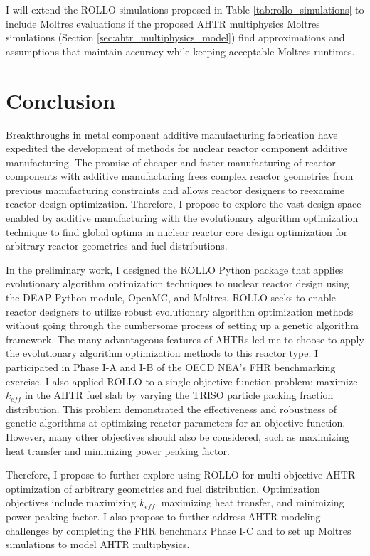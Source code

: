 I will extend the ROLLO simulations proposed in Table \ref{tab:rollo_simulations} 
to include Moltres evaluations if the proposed \gls{AHTR} multiphysics
Moltres simulations (Section \ref{sec:ahtr_multiphysics_model}) find approximations 
and assumptions that maintain accuracy while keeping acceptable Moltres runtimes.

\pagebreak
\section{Conclusion}
Breakthroughs in metal component additive manufacturing fabrication have 
expedited the development of methods for nuclear reactor component additive 
manufacturing.
The promise of cheaper and faster manufacturing of reactor components with 
additive manufacturing frees complex reactor geometries from previous manufacturing 
constraints and allows reactor designers to reexamine reactor design optimization. 
Therefore, I propose to explore the vast design space enabled by 
additive manufacturing with the evolutionary algorithm optimization technique 
to find global optima in nuclear reactor core design optimization for arbitrary 
reactor geometries and fuel distributions.

In the preliminary work, I designed the \gls{ROLLO} Python package that applies 
evolutionary algorithm optimization techniques to nuclear reactor design using 
the \gls{DEAP} Python module, OpenMC, and Moltres.
\gls{ROLLO} seeks to enable reactor designers to utilize 
robust evolutionary algorithm optimization methods without going 
through the cumbersome process of setting up a genetic algorithm framework.
The many advantageous features of \glspl{AHTR} led me to choose to apply the 
evolutionary algorithm optimization methods to this reactor type.
I participated in Phase I-A and I-B of the \acrfull{OECD} \gls{NEA}'s \gls{FHR} 
benchmarking exercise. 
I also applied \gls{ROLLO} to a single objective function problem: maximize 
$k_{eff}$ in the \gls{AHTR} fuel slab by varying the \gls{TRISO} particle 
packing fraction distribution. 
This problem demonstrated the effectiveness and robustness of genetic algorithms 
at optimizing reactor parameters for an objective function. 
However, many other objectives should also be considered, such as maximizing heat 
transfer and minimizing power peaking factor.

Therefore, I propose to further explore using \gls{ROLLO} for multi-objective 
\gls{AHTR} optimization of arbitrary geometries and fuel distribution.
Optimization objectives include maximizing $k_{eff}$, maximizing heat transfer, 
and minimizing power peaking factor. 
I also propose to further address \gls{AHTR} modeling challenges by completing 
the \gls{FHR} benchmark Phase I-C and to set up Moltres simulations to model 
\gls{AHTR} multiphysics.